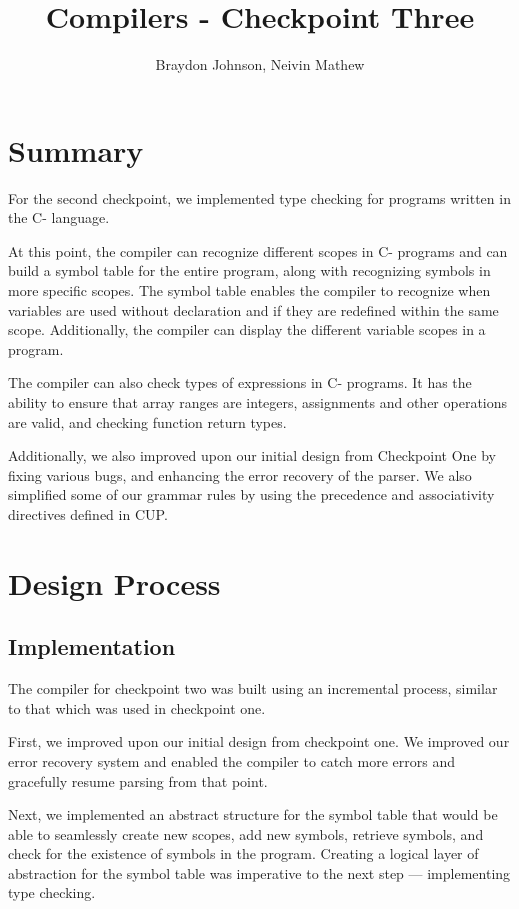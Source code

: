\documentclass[12pt, letterpaper]{article}
\title{\LARGE{\textbf{Compilers - Checkpoint Three}}}
\author{Braydon Johnson, Neivin Mathew}
\begin{document}
\maketitle

\section{Summary}
For the second checkpoint, we implemented type checking for programs written in the C- language.

At this point, the compiler can recognize different scopes in C- programs and can build a symbol table for the entire program, along with recognizing symbols in more specific scopes. The symbol table enables the compiler to recognize when variables are used without declaration and if they are redefined within the same scope. Additionally, the compiler can display the different variable scopes in a program.

The compiler can also check types of expressions in C- programs. It has the ability to ensure that array ranges are integers, assignments and other operations are valid, and checking function return types.

Additionally, we also improved upon our initial design from Checkpoint One by fixing various bugs, and enhancing the error recovery of the parser. We also simplified some of our grammar rules by using the precedence and associativity directives defined in CUP.

\section{Design Process}
\subsection{Implementation}
The compiler for checkpoint two was built using an incremental process, similar to that which was used in checkpoint one.

First, we improved upon our initial design from checkpoint one. We improved our error recovery system and enabled the compiler to catch more errors and gracefully resume parsing from that point.

Next, we implemented an abstract structure for the symbol table that would be able to seamlessly create new scopes, add new symbols, retrieve symbols, and check for the existence of symbols in the program. Creating a logical layer of abstraction for the symbol table was imperative to the next step --- implementing type checking.
\end{document}
